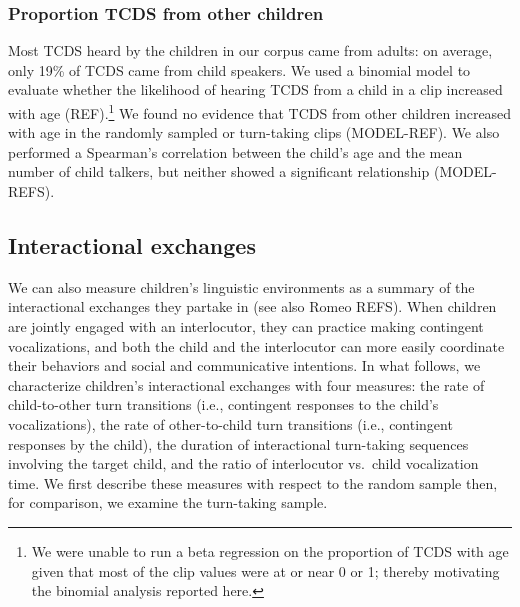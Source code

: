 \documentclass[floatsintext,man]{apa6}
\theoremstyle{definition}
\theoremstyle{definition}
\theoremstyle{definition}
\theoremstyle{remark}
\begin{document}
\subsubsection{Proportion TCDS from other
children}\label{proportion-tcds-from-other-children}

Most TCDS heard by the children in our corpus came from adults: on
average, only 19\% of TCDS came from child speakers. We used a binomial
model to evaluate whether the likelihood of hearing TCDS from a child in
a clip increased with age
(REF).\footnote{We were unable to run a beta regression on the proportion of TCDS with age given that most of the clip values were at or near 0 or 1; thereby motivating the binomial analysis reported here.}
We found no evidence that TCDS from other children increased with age in
the randomly sampled or turn-taking clips (MODEL-REF). We also performed
a Spearman's correlation between the child's age and the mean number of
child talkers, but neither showed a significant relationship
(MODEL-REFS).

\subsection{Interactional exchanges}\label{interactional-exchanges}

We can also measure children's linguistic environments as a summary of
the interactional exchanges they partake in (see also Romeo REFS). When
children are jointly engaged with an interlocutor, they can practice
making contingent vocalizations, and both the child and the interlocutor
can more easily coordinate their behaviors and social and communicative
intentions. In what follows, we characterize children's interactional
exchanges with four measures: the rate of child-to-other turn
transitions (i.e., contingent responses to the child's vocalizations),
the rate of other-to-child turn transitions (i.e., contingent responses
by the child), the duration of interactional turn-taking sequences
involving the target child, and the ratio of interlocutor vs.~child
vocalization time. We first describe these measures with respect to the
random sample then, for comparison, we examine the turn-taking sample.
\end{document}
